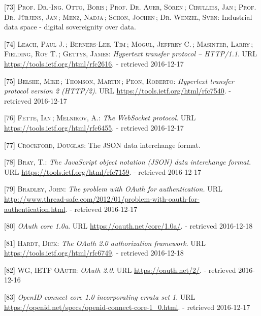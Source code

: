\documentclass[12pt,english,a4paper,titlepage,cleardoublepage=empty,dottedtoc]{report}
\begin{document}
\hypertarget{ref-whitepaper_2016_industrial-data-space}{}
{[}73{]} \textsc{Prof. Dr.-Ing. Otto, Boris}\,; \textsc{Prof. Dr. Auer,
Sören}\,; \textsc{Cirullies, Jan}\,; \textsc{Prof. Dr. Jürjens, Jan}\,;
\textsc{Menz, Nadja}\,; \textsc{Schon, Jochen}\,; \textsc{Dr. Wenzel,
Sven}: Industrial data space - digital sovereignity over data.

\hypertarget{ref-web_spec_http1}{}
{[}74{]} \textsc{Leach, Paul J.}\,; \textsc{Berners-Lee, Tim}\,;
\textsc{Mogul, Jeffrey C.}\,; \textsc{Masinter, Larry}\,;
\textsc{Fielding, Roy T.}\,; \textsc{Gettys, James}: \emph{Hypertext
transfer protocol -- HTTP/1.1}. URL
\url{https://tools.ietf.org/html/rfc2616}. - retrieved 2016-12-17

\hypertarget{ref-web_spec_http2}{}
{[}75{]} \textsc{Belshe, Mike}\,; \textsc{Thomson, Martin}\,;
\textsc{Peon, Roberto}: \emph{Hypertext transfer protocol version 2
(HTTP/2)}. URL \url{https://tools.ietf.org/html/rfc7540}. - retrieved
2016-12-17

\hypertarget{ref-web_spec_websockets}{}
{[}76{]} \textsc{Fette, Ian}\,; \textsc{Melnikov, A.}: \emph{The
WebSocket protocol}. URL \url{https://tools.ietf.org/html/rfc6455}. -
retrieved 2016-12-17

\hypertarget{ref-web_spec_json}{}
{[}77{]} \textsc{Crockford, Douglas}: The JSON data interchange format.

\hypertarget{ref-web_rfc_json}{}
{[}78{]} \textsc{Bray, T.}: \emph{The JavaScript object notation (JSON)
data interchange format}. URL \url{https://tools.ietf.org/html/rfc7159}.
- retrieved 2016-12-17

\hypertarget{ref-web_2012_problem-with-oauth-for-authentication}{}
{[}79{]} \textsc{Bradley, John}: \emph{The problem with OAuth for
authentication.} URL
\url{http://www.thread-safe.com/2012/01/problem-with-oauth-for-authentication.html}.
- retrieved 2016-12-17

\hypertarget{ref-web_spec_oauth-1a}{}
{[}80{]} \emph{OAuth core 1.0a}. URL \url{https://oauth.net/core/1.0a/}.
- retrieved 2016-12-18

\hypertarget{ref-web_spec_oauth-2}{}
{[}81{]} \textsc{Hardt, Dick}: \emph{The OAuth 2.0 authorization
framework}. URL \url{https://tools.ietf.org/html/rfc6749}. - retrieved
2016-12-18

\hypertarget{ref-web_2016_oauth-2}{}
{[}82{]} \textsc{WG, IETF OAuth}: \emph{OAuth 2.0}. URL
\url{https://oauth.net/2/}. - retrieved 2016-12-16

\hypertarget{ref-web_spec_openid-connect-1}{}
{[}83{]} \emph{OpenID connect core 1.0 incorporating errata set 1}. URL
\url{https://openid.net/specs/openid-connect-core-1_0.html}. - retrieved
2016-12-17
\end{document}
